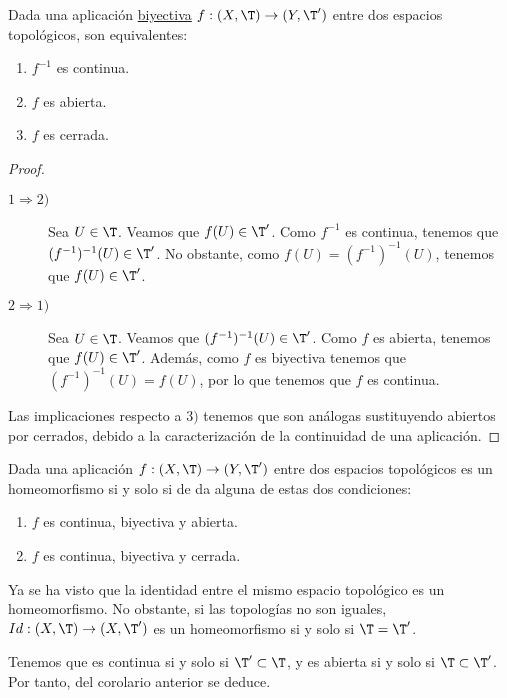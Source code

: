 \begin{prop}
    Dada una aplicación \ul{biyectiva} $f:(X,\T)\to (Y,\T')$ entre dos espacios topológicos, son equivalentes:
    \begin{enumerate}
        \item $f^{-1}$ es continua.
        \item $f$ es abierta.
        \item $f$ es cerrada.
    \end{enumerate}
\end{prop}
\begin{proof}\
    \begin{description}
        \item[$1\Longrightarrow 2)$] Sea $U\in \T$. Veamos que $f(U)\in \T'$. Como $f^{-1}$ es continua, tenemos que $(f^{-1})^{-1}(U)\in \T'$. No obstante, como $f(U)=(f^{-1})^{-1}(U)$, tenemos que $f(U)\in \T'$.

        \item[$2\Longrightarrow 1)$] Sea $U\in \T$. Veamos que $(f^{-1})^{-1}(U)\in \T'$. Como $f$ es abierta, tenemos que $f(U)\in \T'$. Además, como $f$ es biyectiva tenemos que $(f^{-1})^{-1}(U)=f(U)$, por lo que tenemos que $f$ es continua.
    \end{description}

    Las implicaciones respecto a $3)$ tenemos que son análogas sustituyendo abiertos por cerrados, debido a la caracterización de la continuidad de una aplicación.
\end{proof}
\begin{coro}\label{coro:HomeomorfismoEquivContBiyAbierta}
    Dada una aplicación $f:(X,\T)\to (Y,\T')$ entre dos espacios topológicos es un homeomorfismo si y solo si de da alguna de estas dos condiciones:
    \begin{enumerate}
        \item $f$ es continua, biyectiva y abierta.
        \item $f$ es continua, biyectiva y cerrada.
    \end{enumerate}
\end{coro}

\begin{observacion}
    Ya se ha visto que la identidad entre el mismo espacio topológico es un homeomorfismo. No obstante, si las topologías no son iguales, $Id:(X,\T)\to (X,\T')$ es un homeomorfismo si y solo si $\T=\T'$.

    Tenemos que es continua si y solo si $\T'\subset \T$, y es abierta si y solo si $\T\subset \T'$. Por tanto, del corolario anterior se deduce.
\end{observacion}


